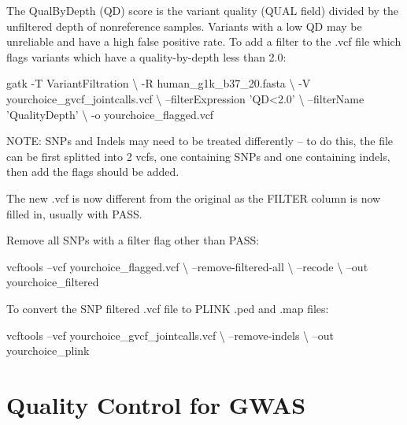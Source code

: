 \documentclass[]{book}
\newenvironment{Shaded}{\begin{snugshade}}{\end{snugshade}}
\newcommand{\StringTok}[1]{\textcolor[rgb]{0.31,0.60,0.02}{#1}}
\newcommand{\ExtensionTok}[1]{#1}
\newcommand{\NormalTok}[1]{#1}
\begin{document}
The QualByDepth (QD) score is the variant quality (QUAL field) divided
by the unfiltered depth of nonreference samples. Variants with a low QD
may be unreliable and have a high false positive rate. To add a filter
to the .vcf file which flags variants which have a quality-by-depth less
than 2.0:

\begin{Shaded}
\begin{Highlighting}[]
\ExtensionTok{gatk}\NormalTok{ -T VariantFiltration \textbackslash{}}
\NormalTok{-R human_g1k_b37_20.fasta \textbackslash{}}
\NormalTok{-V yourchoice_gvcf_jointcalls.vcf \textbackslash{}}
\NormalTok{--filterExpression }\StringTok{'QD<2.0'}\NormalTok{ \textbackslash{}}
\NormalTok{--filterName }\StringTok{'QualityDepth'}\NormalTok{ \textbackslash{}}
\NormalTok{-o yourchoice_flagged.vcf}
\end{Highlighting}
\end{Shaded}

NOTE: SNPs and Indels may need to be treated differently -- to do this,
the file can be first splitted into 2 vcfs, one containing SNPs and one
containing indels, then add the flags should be added.

The new .vcf is now different from the original as the FILTER column is
now filled in, usually with PASS.

Remove all SNPs with a filter flag other than PASS:

\begin{Shaded}
\begin{Highlighting}[]
\ExtensionTok{vcftools}\NormalTok{ --vcf yourchoice_flagged.vcf \textbackslash{}}
\NormalTok{--remove-filtered-all \textbackslash{}}
\NormalTok{--recode \textbackslash{}}
\NormalTok{--out yourchoice_filtered}
\end{Highlighting}
\end{Shaded}

To convert the SNP filtered .vcf file to PLINK .ped and .map files:

\begin{Shaded}
\begin{Highlighting}[]
\ExtensionTok{vcftools}\NormalTok{ --vcf yourchoice_gvcf_jointcalls.vcf \textbackslash{}}
\NormalTok{--remove-indels \textbackslash{}}
\NormalTok{--out yourchoice_plink}
\end{Highlighting}
\end{Shaded}

\section{Quality Control for GWAS}\label{quality-control-for-gwas}
\end{document}
